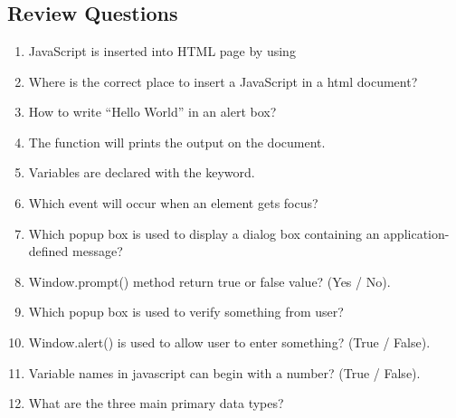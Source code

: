 \documentclass[11pt,a4paper]{article}
\begin{document}
\section*{}
\subsection*{Review Questions}
\begin{enumerate}\itemsep10pt
\item JavaScript is inserted into HTML page by using \underline{\hspace{3cm}}
\item Where is the correct place to insert a JavaScript in a html document? \underline{\hspace{3cm}}
\item How to write ``Hello World'' in an alert box? \underline{\hspace{3cm}}
\item The \underline{\hspace{3cm}} function will prints the output on the document.
\item Variables are declared with the \underline{\hspace{3cm}} keyword.
\item Which event will occur when an element gets focus? \underline{\hspace{3cm}} 
\item Which popup box is used to display a dialog box containing an application-defined message? \underline{\hspace{2cm}} 
\item Window.prompt() method return true or false value? (Yes / No).
\item Which popup box is used to verify something from user? \underline{\hspace{2cm}}
\item Window.alert() is used to allow user to enter something? (True / False).
\item Variable names in javascript can begin with a number? (True / False).
\item What are the three main primary data types? \underline{\hspace{2cm}}
\end{enumerate}
\end{document}

